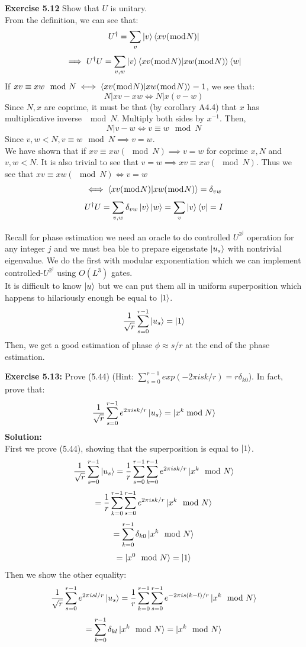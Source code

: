 \documentclass{article}
\begin{document}
\begin{tcolorbox}\textbf{Exercise 5.12} Show that $U$ is unitary.\\
	From the definition, we can see that: $$U^\dag = \sum_v \ket{v} \bra{xv(\bmod N)}$$
	$$\implies U^\dag U = \sum_{v,w} \ket{v} \braket{xv(\bmod N) | xw (\bmod N)} \bra{w}$$
	If $xv \equiv xw \mod N \iff \braket{xv(\bmod N) | xw (\bmod N)} = 1$, we see that:
	$$N| xv-xw \iff N| x(v-w)$$
	Since $N,x$ are coprime, it must be that (by corollary A4.4) that $x$ has multiplicative inverse $\mod N$. Multiply both sides by $x^{-1}$. Then,
	$$N|v-w \iff v \equiv w \mod N$$
	Since $v,w < N, v \equiv w \mod N \implies v=w$.\\
	We have shown that if $xv \equiv xw (\mod N) \implies v=w$ for coprime $x,N$ and $v,w < N$.
	It is also trivial to see that $v=w \implies xv \equiv xw (\mod N)$.
	Thus we see that $xv \equiv xw (\mod N) \iff v=w$
	$$\iff \braket{xv (\bmod N) | xw (\bmod N)} = \delta_{vw}$$
	$$U^\dag U = \sum_{v,w} \delta_{vw} \ket{v}\ket{w} = \sum_{v} \ket{v}\bra{v}= I$$
\end{tcolorbox}
Recall for phase estimation we need an oracle to do controlled $U^{2^j}$ operation for any integer $j$ and we must bea ble to prepare eigenstate $\ket{u_s}$ with nontrivial eigenvalue. We do the first with modular exponentiation which we can implement controlled-$U^{2^j}$ using $O(L^3)$ gates.\\
It is difficult to know $\ket{u}$ but we can put them all in uniform superposition which happens to hilariously enough be equal to $\ket{1}$.
$$\frac{1}{\sqrt{r}} \sum_{s=0}^{r-1} \ket{u_s} = \ket{1}$$
Then, we get a good estimation of phase $\phi \approx s/r$ at the end of the phase estimation. 
\begin{tcolorbox}\textbf{Exercise 5.13:} Prove (5.44) (Hint: $\sum_{s=0}^{r-1} exp(-2\pi i sk/r) = r \delta_{k0}$). In fact, prove that:
	$$\frac{1}{\sqrt{r}} \sum^{r-1}_{s=0} e^{2\pi isk/r} \ket{u_s} = \ket{x^k \bmod N}$$
\textbf{Solution:}\\
First we prove (5.44), showing that the superposition is equal to $\ket{1}$.
$$\frac{1}{\sqrt{r}} \sum^{r-1}_{s=0}\ket{u_s} = \frac{1}{r} \sum^{r-1}_{s=0} \sum^{r-1}_{k=0} e^{2\pi isk/r}\ket{x^k \mod N}$$
$$= \frac{1}{r} \sum^{r-1}_{k=0} \sum^{r-1}_{s=0} e^{2\pi isk/r}\ket{x^k \mod N} $$
$$= \sum^{r-1}_{k=0} \delta_{k0} \ket{x^k \mod N}$$
$$= \ket{x^0 \mod N} = \ket{1}$$
Then we show the other equality:
$$\frac{1}{\sqrt{r}} \sum^{r-1}_{s=0} e^{2\pi isl/r} \ket{u_s} = \frac{1}{r} \sum^{r-1}_{k=0} \sum^{r-1}_{s=0}e^{-2\pi is(k-l)/r}\ket{x^k \mod N}$$
$$= \sum^{r-1}_{k=0} \delta_{kl} \ket{x^k \mod N}  = \ket{x^k \mod N}$$
\end{tcolorbox}
\end{document}
